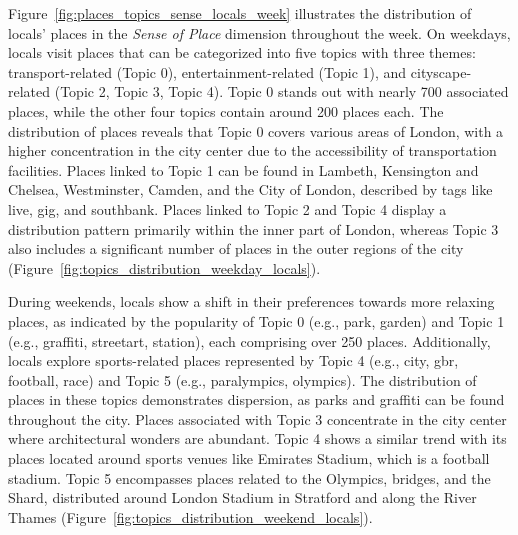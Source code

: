 \documentclass{article}
\theoremstyle{definition}
\theoremstyle{remark}
\begin{document}
Figure~\ref{fig:places_topics_sense_locals_week} illustrates the distribution of locals' places in the \textit{Sense of Place} dimension throughout the week. On weekdays, locals visit places that can be categorized into five topics with three themes: transport-related (Topic 0), entertainment-related (Topic 1), and cityscape-related (Topic 2, Topic 3, Topic 4). Topic 0 stands out with nearly 700 associated places, while the other four topics contain around 200 places each. The distribution of places reveals that Topic 0 covers various areas of London, with a higher concentration in the city center due to the accessibility of transportation facilities. Places linked to Topic 1 can be found in Lambeth, Kensington and Chelsea, Westminster, Camden, and the City of London, described by tags like live, gig, and southbank. Places linked to Topic 2 and Topic 4 display a distribution pattern primarily within the inner part of London, whereas Topic 3 also includes a significant number of places in the outer regions of the city (Figure~\ref{fig:topics_distribution_weekday_locals}).

During weekends, locals show a shift in their preferences towards more relaxing places, as indicated by the popularity of Topic 0 (e.g., park, garden) and Topic 1 (e.g., graffiti, streetart, station), each comprising over 250 places. Additionally, locals explore sports-related places represented by Topic 4 (e.g., city, gbr, football, race) and Topic 5 (e.g., paralympics, olympics). The distribution of places in these topics demonstrates dispersion, as parks and graffiti can be found throughout the city. Places associated with Topic 3 concentrate in the city center where architectural wonders are abundant. Topic 4 shows a similar trend with its places located around sports venues like Emirates Stadium, which is a football stadium. Topic 5 encompasses places related to the Olympics, bridges, and the Shard, distributed around London Stadium in Stratford and along the River Thames (Figure~\ref{fig:topics_distribution_weekend_locals}).
\end{document}
